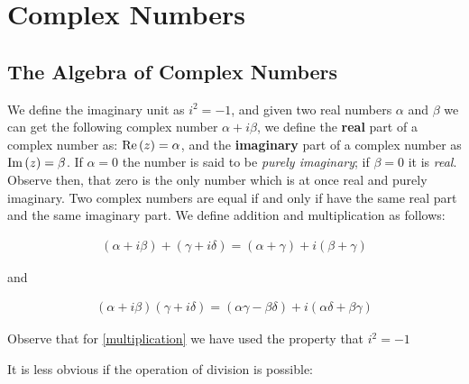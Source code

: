 \chapter{Complex Numbers}
\section{The Algebra of Complex Numbers}\label{sec:the-algebra-of-complex-numbers}
We define the imaginary unit as $ i^2 = -1 $, and given two real numbers $ \alpha$ and $ \beta$ we can get the following complex number $ \alpha + i \beta$,  we define the \textbf{real} part of a complex number as: $ \mathrm{Re} \left(  z  \right) = \alpha $, and the \textbf{imaginary} part of a complex number as $ \mathrm{Im} \left( z \right) = \beta $. If $ \alpha = 0$ the number is said to be \emph{purely imaginary}; if $ \beta = 0$ it is \emph{real}. Observe then, that zero is the only number which is at once real and purely imaginary. Two complex numbers are equal if and only if have the same real part and the same imaginary part.
We define addition and multiplication as follows:
 
\begin{align} \label{Addition}
(\alpha + i \beta) + ( \gamma + i \delta) = (\alpha + \gamma) + i(\beta + \gamma) 
\end{align}

and

\begin{align} \label{multiplication}
(\alpha + i \beta) ( \gamma + i \delta) = ( \alpha \gamma - \beta \delta) + i ( \alpha \delta + \beta \gamma)
\end{align}

Observe that for \eqref{multiplication} we have used the property that $ i ^2 = -1 $

It is less obvious if the operation of division is possible:

